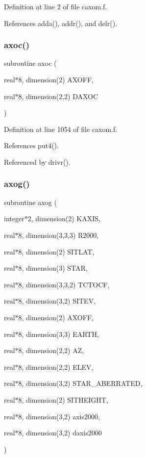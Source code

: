 Definition at line 2 of file caxom.\+f.



References adda(), addr(), and delr().

\mbox{\label{caxom_8f_ab35e84a52a7029ee61b540fe53998221}} 
\subsubsection{\texorpdfstring{axoc()}{axoc()}}
{\footnotesize\ttfamily subroutine axoc (\begin{DoxyParamCaption}\item[{real$\ast$8, dimension(2)}]{A\+X\+O\+FF,  }\item[{real$\ast$8, dimension(2,2)}]{D\+A\+X\+OC }\end{DoxyParamCaption})}



Definition at line 1054 of file caxom.\+f.



References put4().



Referenced by drivr().

\mbox{\label{caxom_8f_ae2477acae4c628d09e3a0f61f28a62ef}} 
\subsubsection{\texorpdfstring{axog()}{axog()}}
{\footnotesize\ttfamily subroutine axog (\begin{DoxyParamCaption}\item[{integer$\ast$2, dimension(2)}]{K\+A\+X\+IS,  }\item[{real$\ast$8, dimension(3,3,3)}]{R2000,  }\item[{real$\ast$8, dimension(2)}]{S\+I\+T\+L\+AT,  }\item[{real$\ast$8, dimension(3)}]{S\+T\+AR,  }\item[{real$\ast$8, dimension(3,3,2)}]{T\+C\+T\+O\+CF,  }\item[{real$\ast$8, dimension(3,2)}]{S\+I\+T\+EV,  }\item[{real$\ast$8, dimension(2)}]{A\+X\+O\+FF,  }\item[{real$\ast$8, dimension(3,3)}]{E\+A\+R\+TH,  }\item[{real$\ast$8, dimension(2,2)}]{AZ,  }\item[{real$\ast$8, dimension(2,2)}]{E\+L\+EV,  }\item[{real$\ast$8, dimension(3,2)}]{S\+T\+A\+R\+\_\+\+A\+B\+E\+R\+R\+A\+T\+ED,  }\item[{real$\ast$8, dimension(2)}]{S\+I\+T\+H\+E\+I\+G\+HT,  }\item[{real$\ast$8, dimension(3,2)}]{axis2000,  }\item[{real$\ast$8, dimension(3,2)}]{daxis2000 }\end{DoxyParamCaption})}



